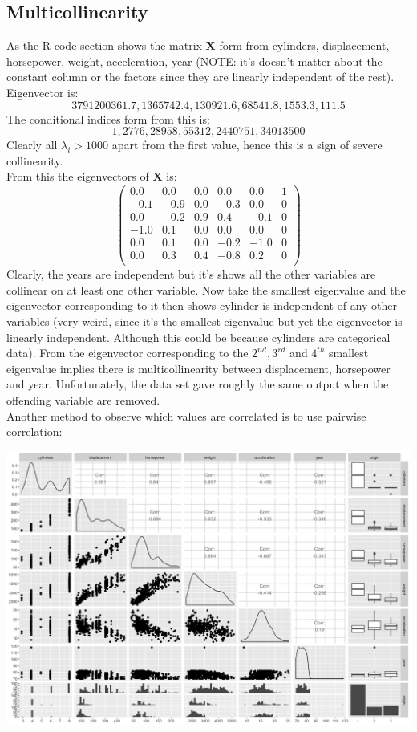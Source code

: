 \documentclass[11pt]{article} %
\begin{document}
\subsection{Multicollinearity}
As the R-code section shows the matrix $\pmb{X}$ form from cylinders, displacement, horsepower, weight, acceleration, year (NOTE: it's doesn't matter about the constant column or the factors since they are linearly independent of the rest).\\ 
Eigenvector is:
$$
3791200361.7,1365742.4,130921.6,68541.8,1553.3,111.5
$$
The conditional indices form from this is:
$$
 1,2776,28958,55312,2440751,34013500
$$
Clearly all $\lambda_i>1000$ apart from the first value, hence this is a sign of severe collinearity.\\
From this the eigenvectors of $\pmb{X}$ is:
$$
\begin{pmatrix}
0.0&0.0&0.0&0.0&0.0&1\\
-0.1&-0.9&0.0&-0.3&0.0&0\\
0.0&-0.2&0.9&0.4&-0.1&0\\
-1.0&0.1&0.0&0.0&0.0&0\\
0.0&0.1&0.0&-0.2&-1.0&0\\
0.0&0.3&0.4&-0.8&0.2&0\\
\end{pmatrix}
$$
Clearly, the years are independent but it's shows all the other variables are collinear on at least one other variable. Now take the smallest eigenvalue and the eigenvector corresponding to it then shows cylinder is independent of any other variables (very weird, since it's the smallest eigenvalue but yet the eigenvector is linearly independent. Although this could be because cylinders are categorical data). From the eigenvector corresponding to the $2^{nd},3^{rd}$ and $4^{th}$ smallest eigenvalue implies there is multicollinearity between displacement, horsepower and year. Unfortunately, the data set gave roughly the same output when the offending variable are removed.\\
Another method to observe which values are correlated is to use pairwise correlation:
\begin{center}
\includegraphics[scale=0.3]{pair_cor}
\end{center}
\end{document}
